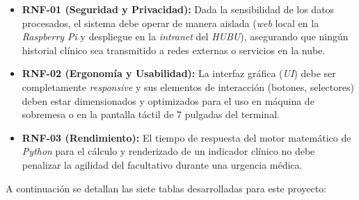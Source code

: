 \begin{itemize}
    \item \textbf{RNF-01 (Seguridad y Privacidad):} Dada la sensibilidad de los datos procesados, el sistema debe operar de manera aislada (\textit{web} local en la \textit{Raspberry Pi} y despliegue en la \textit{intranet} del \textit{HUBU}), asegurando que ningún historial clínico sea transmitido a redes externas o servicios en la nube.
    \item \textbf{RNF-02 (Ergonomía y Usabilidad):} La interfaz gráfica (\textit{UI}) debe ser completamente \textit{responsive} y sus elementos de interacción (botones, selectores) deben estar dimensionados y optimizados para el uso en máquina de sobremesa o en la pantalla táctil de 7 pulgadas del terminal.
    \item \textbf{RNF-03 (Rendimiento):} El tiempo de respuesta del motor matemático de \textit{Python} para el cálculo y renderizado de un indicador clínico no debe penalizar la agilidad del facultativo durante una urgencia médica.
\end{itemize}

A continuación se detallan las siete tablas desarrolladas para este proyecto:

